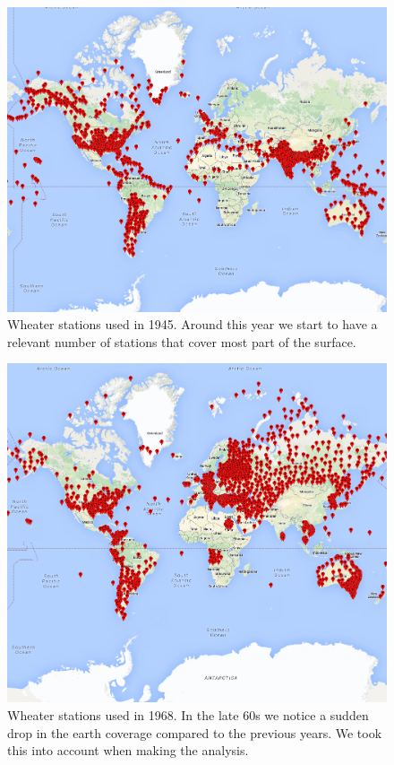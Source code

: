 \documentclass{vldb}
\begin{document}
\begin{figure}[tbh]
\includegraphics[width=1\linewidth]{stations1945}
\caption{Wheater stations used in 1945. Around this year we start to have a relevant number of stations that cover most part of the surface.}
\label{fig:stations1945}
\end{figure}

\begin{figure}[tbh]
\includegraphics[width=1\linewidth]{stations1968}
\caption{Wheater stations used in 1968. In the late 60s we notice a sudden drop in the earth coverage compared to the previous years. We took this into account when making the analysis.}
\label{fig:stations1968}
\end{figure}
\end{document}
